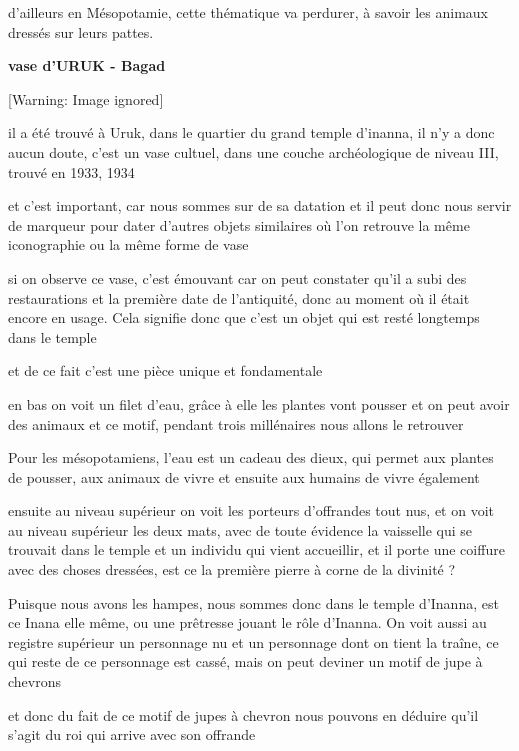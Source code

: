 \documentclass[a4paper,10pt]{article}
\newcommand{\DirImg}{../img/FaivreMartin/}
\begin{document}
d'ailleurs en Mésopotamie, cette thématique va
perdurer,  à savoir les animaux dressés sur leurs pattes.

\textbf{vase d'URUK - Bagad}

  [Warning: Image ignored] %
 

il a été trouvé à Uruk, dans le quartier du grand temple
d'inanna, il n'y a donc aucun doute,
c'est un vase cultuel, dans une couche archéologique
de niveau III, trouvé en 1933, 1934

et c'est important, car nous sommes sur de sa datation
et il peut donc nous servir de marqueur pour dater
d'autres objets similaires où l'on
retrouve la même iconographie ou la même forme de vase

si on observe ce vase, c'est émouvant car on peut
constater qu'il a subi des restaurations  et la
première date de l'antiquité, donc au moment où il
était encore en usage. Cela signifie donc que c'est un
objet qui est resté longtemps dans le temple

et de ce fait c'est une pièce unique et fondamentale

en bas on voit un filet d'eau, grâce à elle les 
plantes vont pousser  et on peut avoir des animaux et ce motif, pendant
trois millénaires nous allons le retrouver

Pour les mésopotamiens, l'eau est un cadeau des dieux,
qui permet aux plantes de pousser, aux animaux de vivre et ensuite aux
humains de vivre également

ensuite au niveau supérieur on voit les porteurs
d'offrandes tout nus, et on voit au niveau supérieur
les deux mats, avec de toute évidence la vaisselle qui se trouvait dans
le temple et un individu qui vient accueillir, et il porte une coiffure
avec des choses dressées, est  ce la première pierre à corne de la
divinité ?

Puisque nous avons les hampes, nous sommes donc dans le temple
d'Inanna, est ce Inana elle même, ou une prêtresse
jouant le rôle d'Inanna. On voit aussi au registre
supérieur un personnage nu et un personnage dont on tient la traîne, ce
qui reste de ce personnage est cassé, mais on peut deviner un motif de
jupe à chevrons

et donc du fait de ce motif de jupes à chevron nous pouvons en déduire
qu'il s'agit du roi qui arrive avec
son offrande
\end{document}
